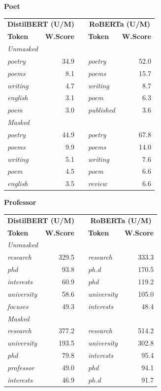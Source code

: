 \documentclass[11pt]{article}
\begin{document}
\vspace{4pt}\noindent\textbf{Poet}
\begin{center}\scriptsize
\begin{tabular}{lrllr}
\toprule
\multicolumn{2}{c}{\textbf{DistilBERT (U/M)}} & & \multicolumn{2}{c}{\textbf{RoBERTa (U/M)}} \\
\textbf{Token} & \textbf{W.Score} & & \textbf{Token} & \textbf{W.Score} \\
\midrule
\multicolumn{5}{l}{\textit{Unmasked}} \\
\emph{poetry} & 34.9 & & \emph{poetry} & 52.0 \\
\emph{poems} & 8.1 & & \emph{poems} & 15.7 \\
\emph{writing} & 4.7 & & \emph{writing} & 8.7 \\
\emph{english} & 3.1 & & \emph{poem} & 6.3 \\
\emph{poem} & 3.0 & & \emph{published} & 3.6 \\
\multicolumn{5}{l}{\textit{Masked}} \\
\emph{poetry} & 44.9 & & \emph{poetry} & 67.8 \\
\emph{poems} & 9.9 & & \emph{poems} & 14.0 \\
\emph{writing} & 5.1 & & \emph{writing} & 7.6 \\
\emph{poem} & 4.5 & & \emph{poem} & 6.6 \\
\emph{english} & 3.5 & & \emph{review} & 6.6 \\
\bottomrule
\end{tabular}
\end{center}

\vspace{4pt}\noindent\textbf{Professor}
\begin{center}\scriptsize
\begin{tabular}{lrllr}
\toprule
\multicolumn{2}{c}{\textbf{DistilBERT (U/M)}} & & \multicolumn{2}{c}{\textbf{RoBERTa (U/M)}} \\
\textbf{Token} & \textbf{W.Score} & & \textbf{Token} & \textbf{W.Score} \\
\midrule
\multicolumn{5}{l}{\textit{Unmasked}} \\
\emph{research} & 329.5 & & \emph{research} & 333.3 \\
\emph{phd} & 93.8 & & \emph{ph.d} & 170.5 \\
\emph{interests} & 60.9 & & \emph{phd} & 119.2 \\
\emph{university} & 58.6 & & \emph{university} & 105.0 \\
\emph{focuses} & 49.3 & & \emph{interests} & 48.4 \\
\multicolumn{5}{l}{\textit{Masked}} \\
\emph{research} & 377.2 & & \emph{research} & 514.2 \\
\emph{university} & 193.5 & & \emph{university} & 302.8 \\
\emph{phd} & 79.8 & & \emph{interests} & 95.4 \\
\emph{professor} & 49.0 & & \emph{phd} & 94.1 \\
\emph{interests} & 46.9 & & \emph{ph.d} & 91.7 \\
\bottomrule
\end{tabular}
\end{center}
\end{document}
